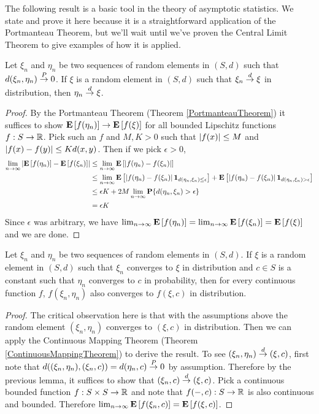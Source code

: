 The following result is a basic tool in the theory of asymptotic
statistics.  We state and prove it here because it is a
straightforward application of the Portmanteau Theorem, but we'll wait
until we've proven the Central Limit Theorem to give examples of how
it is applied.  
\begin{thm}\label{Slutsky}Let $\xi_n$ and $\eta_n$ be two sequences of
  random elements in $(S,d)$ such that $d(\xi_n,\eta_n) \overset{P}\to 0$.  
If $\xi$ is a random element in $(S,d)$
such that $\xi_n \overset{d}\to \xi$ in distribution, then
  $\eta_n \overset{d}\to \xi$.
\end{thm}
\begin{proof}
By the Portmanteau Theorem (Theorem \ref{PortmanteauTheorem}) it
suffices to show $\textbf{E}\left[f(\eta_n)\right] \to \textbf{E}\left[f(\xi)\right]$
for all bounded Lipschitz functions $f : S \to \mathbb{R}$.  Pick such an
$f$ and $M,K > 0$ such that $\left \vert f(x) \right \vert \leq M$ and $\left \vert f(x) - f(y) \right \vert \leq K
d(x,y)$.  Then if we pick $\epsilon > 0$,
\begin{align*}
\lim_{n \to \infty} \left \vert \textbf{E}\left[f(\eta_n)\right] -
  \textbf{E}\left[f(\xi_n)\right] \right \vert &\leq \lim_{n \to \infty} \textbf{E}\left[\left \vert 
    f(\eta_n) - f(\xi_n) \right \vert\right] \\
&\leq \lim_{n \to \infty} \textbf{E}\left[\left \vert 
    f(\eta_n) - f(\xi_n) \right \vert\textbf{1}_{d(\eta_n, \xi_n) \leq
    \epsilon}\right] +  \textbf{E}\left[\left \vert 
    f(\eta_n) - f(\xi_n) \right \vert\textbf{1}_{d(\eta_n ,\xi_n) >
    \epsilon} \right] \\
&\leq \epsilon K +  2 M \lim_{n \to \infty} \textbf{P}\{d(\eta_n ,\xi_n) >
    \epsilon\} \\
&= \epsilon K 
\end{align*}
Since $\epsilon$ was arbitrary, we have $\lim_{n \to \infty}\textbf{E}\left[f(\eta_n)\right] =
\lim_{n \to \infty}\textbf{E}\left[f(\xi_n)\right] = \textbf{E}\left[f(\xi)\right]  $ and we are done.
\end{proof}
\begin{cor}Let $\xi_n$ and $\eta_n$ be two sequences of
random elements in $(S,d)$.  If $\xi$ is a random element in $(S,d)$
such that $\xi_n$ converges to $\xi$ in distribution and $c \in S$ is
  a constant such that $\eta_n$ converges to $c$ in probability, then for
  every continuous function $f$,
  $f(\xi_n,\eta_n)$ also converges to $f(\xi,c)$ in distribution.
\end{cor}
\begin{proof}
The critical observation here is that with the assumptions above the
random element $(\xi_n,\eta_n)$ converges to $(\xi,c)$ in
distribution.  Then we can apply the Continuous Mapping Theorem
(Theorem \ref{ContinuousMappingTheorem}) to
derive the result.  To see $(\xi_n,\eta_n) \overset{d}\to (\xi,c)$, first
note that $d((\xi_n, \eta_n), (\xi_n, c)) = d(\eta_n, c) \overset{P}\to 0$ by
assumption.  Therefore by the previous lemma, it suffices to show that
$(\xi_n, c) \overset{d}\to (\xi,c)$.  Pick a continuous bounded function $f :
S \times S \to \mathbb{R}$ and note that $f(-,c) : S \to \mathbb{R}$ is also
continuous and bounded.  Therefore $\lim_{n \to \infty}
\textbf{E}\left[f(\xi_n, c)\right] = \textbf{E}\left[f(\xi,c)\right]$.
\end{proof}

